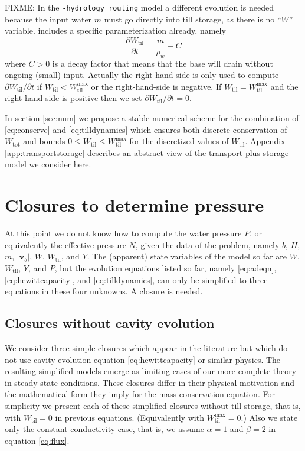 \documentclass[11pt,final]{amsart}
\newcommand\bv{\mathbf{v}}
\newcommand{\Wtil}{W_{\text{til}}}
\newcommand{\Wtilmax}{W_{\text{til}}^{\text{max}}}
\newcommand{\Wtot}{W_{\text{tot}}}
\begin{document}
FIXME: In the \texttt{-hydrology routing} model a different evolution is needed because the input water $m$ must go directly into till storage, as there is no ``$W$'' variable.  \cite{BBssasliding} includes a specific parameterization already, namely
\begin{equation}
\frac{\partial \Wtil}{\partial t} = \frac{m}{\rho_w} - C  \label{eq:tilldynamicsrouting}
\end{equation}
where $C>0$ is a decay factor that means that the base will drain without ongoing (small) input.  Actually the right-hand-side is only used to compute $\partial \Wtil/\partial t$ if $\Wtil < \Wtilmax$ or the right-hand-side is negative.  If $\Wtil = \Wtilmax$ and the right-hand-side is positive then we set $\partial \Wtil/\partial t=0$.

In section \ref{sec:num} we propose a stable numerical scheme for the combination of \eqref{eq:conserve} and \eqref{eq:tilldynamics} which ensures both discrete conservation of $\Wtot$ and bounds $0\le \Wtil \le \Wtilmax$ for the discretized values of $\Wtil$.  Appendix \ref{app:transportstorage} describes an abstract view of the transport-plus-storage model we consider here.


\section{Closures to determine pressure} \label{sec:closures}

At this point we do not know how to compute the water pressure $P$, or equivalently the effective pressure $N$, given the data of the problem, namely $b$, $H$, $m$, $|\bv_b|$, $W$, $\Wtil$, and $Y$.  The (apparent) state variables of the model so far are $W$, $\Wtil$, $Y$, and $P$, but the evolution equations listed so far, namely \eqref{eq:adeqn}, \eqref{eq:hewittcapacity}, and \eqref{eq:tilldynamics}, can only be simplified to three equations in these four unknowns.   A closure is needed.

\subsection*{Closures without cavity evolution}  We consider three simple closures which appear in the literature but which do not use cavity evolution equation \eqref{eq:hewittcapacity} or similar physics.  The resulting simplified models emerge as limiting cases of our more complete theory in steady state conditions.  These closures differ in their physical motivation and the mathematical form they imply for the mass conservation equation.  For simplicity we present each of these simplified closures without till storage, that is, with $\Wtil=0$ in previous equations.  (Equivalently with $\Wtilmax=0$.)  Also we state only the constant conductivity case, that is, we assume $\alpha=1$ and $\beta=2$ in equation \eqref{eq:flux}.
\end{document}
